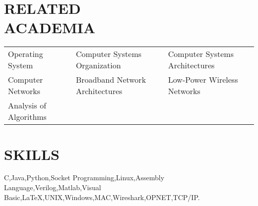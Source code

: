\documentclass[margin,line]{resume}
\begin{document}
\begin{resume}
\sectionline

    \section{\mysidestyle \textbf{\large{R}\small{ELATED\\ACADEMIA}}} 

	\vspace{1mm} %
	\begin{tabular}{@{}p{4cm}p{5.5cm}p{5.5cm}}
	Operating System     &  Computer Systems Organization        &  Computer Systems Architectures\\
	Computer Networks    &  Broadband Network Architectures      &  Low-Power Wireless Networks\\
	Analysis of Algorithms %
	\end{tabular}

\sectionline

    \section{\mysidestyle \textbf{\large{S}\small{KILLS}}}

    C,\hspace{2mm}Java,\hspace{2mm}Python,\hspace{2mm}Socket Programming,\hspace{2mm}Linux,\hspace{2mm}Assembly Language,\hspace{2mm}Verilog,\hspace{2mm}Matlab,\hspace{2mm}Visual Basic,\hspace{2mm}\LaTeX,\hspace{2mm}UNIX,\hspace{2mm}Windows,\hspace{2mm}MAC,\hspace{2mm}Wireshark,\hspace{2mm}OPNET,\hspace{2mm}TCP/IP.


\end{resume}
\end{document}
